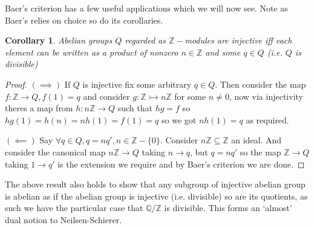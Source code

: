 \documentclass[12pt]{article}
\numberwithin{equation}{section}
\newcommand{\Q}{\mathbb{Q}}
\newcommand{\Z}{\mathbb{Z}}
\newtheorem{corollary}{Corollary}[theorem]
\begin{document}
	Baer's criterion has a few useful applications which we will now see. Note as Baer's relies on choice so do its corollaries.
	
	\begin{corollary}
		Abelian groups $Q$ regarded as $\Z-$modules are injective iff each element can be written as a product of nonzero $n \in \Z$ and some $q \in Q $ (i.e. $Q$ is divisible)
	\end{corollary}
	\begin{proof}
		$(\implies)$ If $Q$ is injective fix some arbitrary $q \in Q$. Then consider the map $f: \Z \to Q, f(1)=q$ and consider $g: \Z \rightarrowtail n\Z$ for some $n \neq 0$, now via injectivity theres a map from $h: n\Z \to Q$ such that $hg=f$ so $hg(1)=h(n)=nh(1)=f(1)=q$ so we got $n h(1)=q$ as required.
		
		$(\impliedby)$ Say $\forall q \in Q, q=nq', n\in \Z-\{0\}$. Consider $n\Z \subseteq \Z$ an ideal. And consider the canonical map $n\Z \to Q$ taking $n \to q$, but $q=n q'$ so the map $\Z \to Q$ taking $1 \to q'$ is the extension we require and by Baer's criterion we are done.
	\end{proof}
	The above result also holds to show that any subgroup of injective abelian group is abelian as if the abelian group is injective (i.e. divisible) so are its quotients, as such we have the particular case that $\Q/\Z$ is divisible. This forms an `almost' dual notion to Neilsen-Schierer.
	
\end{document}
